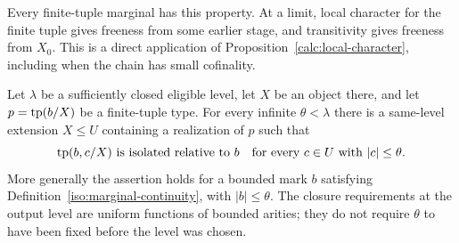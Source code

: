 Every finite-tuple marginal has this property. At a limit, local character
for the finite tuple gives freeness from some earlier stage, and
transitivity gives freeness from $X_0$. This is a direct application of
Proposition~\ref{calc:local-character}, including when the chain has small
cofinality.

\begin{proposition}\label{iso:finite-existence}
Let $\lambda$ be a sufficiently closed eligible level, let $X$ be an
object there, and let $p=\operatorname{tp}(b/X)$ be a finite-tuple type. For every
infinite $\theta<\lambda$ there is a same-level extension $X\leq U$
containing a realization of $p$ such that
\[
 \operatorname{tp}(b,c/X)\text{ is isolated relative to }b
 \quad\text{for every }c\in U\text{ with }|c|\leq\theta.
\]
More generally the assertion holds for a bounded mark $b$ satisfying
Definition~\ref{iso:marginal-continuity}, with $|b|\leq\theta$.
The closure requirements at the output level are uniform functions of
bounded arities; they do not require $\theta$ to have been fixed before
the level was chosen.
\end{proposition}


